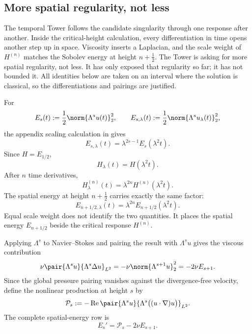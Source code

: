 \subsection{More spatial regularity, not less}\label{sub:ThePressureCompleteMixedDerivativeTower}

The temporal Tower follows the candidate singularity through one response after another.
Inside the critical-height calculation, every differentiation in time opens another step up in space.
Viscosity inserts a Laplacian, and the scale weight of \(H^{(n)}\) matches the Sobolev energy at height \(n+\tfrac12\).
The Tower is asking for more spatial regularity, not less.
It has only exposed that regularity so far; it has not bounded it.
All identities below are taken on an interval where the solution is classical, so the differentiations and pairings are justified.

For
\[
  E_s(t):=\frac12\norm{\Lambda^su(t)}_2^2,
  \qquad
  E_{s,\lambda}(t):=\frac12\norm{\Lambda^su_\lambda(t)}_2^2,
\]
the appendix scaling calculation in  gives
\begin{equation}\label{eq:BodySpatialEnergyScaling}
  E_{s,\lambda}(t)
  =\lambda^{2s-1}E_s(\lambda^2t).
\end{equation}
Since \(H=E_{1/2}\),
\[
  H_\lambda(t)=H(\lambda^2t).
\]
After \(n\) time derivatives,
\begin{equation}\label{eq:BodyCriticalHeightTemporalScaling}
  H_\lambda^{(n)}(t)
  =\lambda^{2n}H^{(n)}(\lambda^2t).
\end{equation}
The spatial energy at height \(n+\tfrac12\) carries exactly the same factor:
\begin{equation}\label{eq:BodySpatialHeightScalingDiagonal}
  E_{n+1/2,\lambda}(t)
  =\lambda^{2n}E_{n+1/2}(\lambda^2t).
\end{equation}
Equal scale weight does not identify the two quantities.
It places the spatial energy \(E_{n+1/2}\) beside the critical response \(H^{(n)}\).

Applying \(\Lambda^s\) to Navier--Stokes and pairing the result with \(\Lambda^su\) gives the viscous contribution
\[
  \nu\pair{\Lambda^su}{\Lambda^s\Delta u}_{L^2}
  =-\nu\norm{\Lambda^{s+1}u}_2^2
  =-2\nu E_{s+1}.
\]
Since the global pressure pairing vanishes against the divergence-free velocity, define the nonlinear production at height \(s\) by
\[
  \mathcal P_s
  :=-
  \operatorname{Re}
  \pair{\Lambda^su}
  {\Lambda^s\bigl((u\cdot\nabla)u\bigr)}_{L^2}.
\]
The complete spatial-energy row is
\begin{equation}\label{eq:BodyCriticalEnergyBalance}
  E_s'=\mathcal P_s-2\nu E_{s+1}.
\end{equation}

